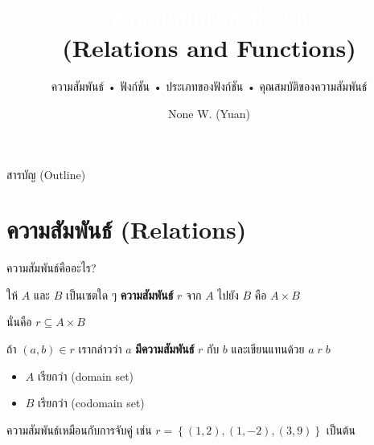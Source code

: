 \documentclass[11pt, aspectratio=169]{beamer}
\title[ความสัมพันธ์และฟังก์ชัน]{\textcolor{white}{ความสัมพันธ์และฟังก์ชัน} \\ \textcolor{boxBlue!60}{(Relations and Functions)}}
\subtitle{ความสัมพันธ์ • ฟังก์ชัน • ประเภทของฟังก์ชัน • คุณสมบัติของความสัมพันธ์ }
\author[None Wanitchollakit]{None W. (Yuan)}
\date{}
\begin{document}
\begin{frame}[plain]
  \titlepage
\end{frame}

\begin{frame}{สารบัญ (Outline)}
  \tableofcontents
\end{frame}

\section{ความสัมพันธ์ (Relations)}

\begin{frame}{ความสัมพันธ์คืออะไร?}
  \begin{explanation}
    ให้ $A$ และ $B$ เป็นเซตใด ๆ \textbf{ความสัมพันธ์} $r$ จาก $A$ ไปยัง $B$
    คือ  $A \times B$

    \medskip
    นั่นคือ $r \subseteq A \times B$

    \medskip
    ถ้า $(a, b) \in r$ เรากล่าวว่า $a$ \textbf{มีความสัมพันธ์} $r$ กับ $b$
    และเขียนแทนด้วย $a \; r \; b$
  \end{explanation}

  \begin{itemize}
    \item $A$ เรียกว่า  (domain set)
    \item $B$ เรียกว่า  (codomain set)
  \end{itemize}

  \begin{exambox}[ตัวอย่าง]
    ความสัมพันธ์เหมือนกับการจับคู่ เช่น $r=\left\{(1,2),(1,-2),(3, 9)\right\} $ เป็นต้น
  \end{exambox}
\end{frame}
\end{document}
